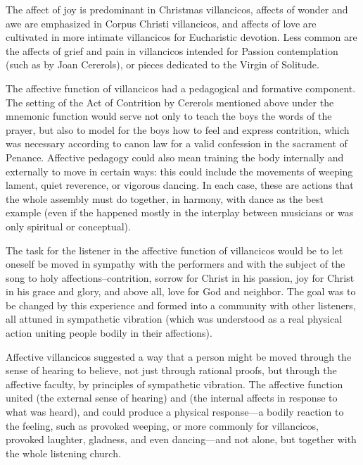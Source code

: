 The affect of joy is predominant in Christmas villancicos, affects of wonder and awe are emphasized in Corpus Christi villancicos, and affects of love are cultivated in more intimate villancicos for Eucharistic devotion. 
Less common are the affects of grief and pain in villancicos intended for Passion contemplation (such as  by Joan Cererols), or pieces dedicated to the Virgin of Solitude.%
	\autocite{Cererols:MEM-VC}

The affective function of villancicos had a pedagogical and formative component.
The setting of the Act of Contrition  by Cererols mentioned above under the mnemonic function would serve not only to teach the boys the words of the prayer, but also to model for the boys how to feel and express contrition, which was necessary according to canon law for a valid confession in the sacrament of Penance. 
Affective pedagogy could also mean training the body internally and externally to move in certain ways: this could include the movements of weeping lament, quiet reverence, or vigorous dancing.
In each case, these are actions that the whole assembly must do together, in harmony, with dance as the best example (even if the  happened mostly in the interplay between musicians or was only spiritual or conceptual).

The task for the listener in the affective function of villancicos would be to let oneself be moved in sympathy with the performers and with the subject of the song to holy affections--contrition, sorrow for Christ in his passion, joy for Christ in his grace and glory, and above all, love for God and neighbor.
The goal was to be changed by this experience and formed into a community with other listeners, all attuned in sympathetic vibration (which was understood as a real physical action uniting people bodily in their affections).

Affective villancicos suggested a way that a person might be moved through the sense of hearing to believe, not just through rational proofs, but through the affective faculty, by principles of sympathetic vibration.
The affective function united  (the external sense of hearing) and  (the internal affects in response to what was heard), and could produce a physical response---a bodily reaction to the feeling, such as provoked weeping, or more commonly for villancicos, provoked laughter, gladness, and even dancing---and not alone, but together with the whole listening church.

